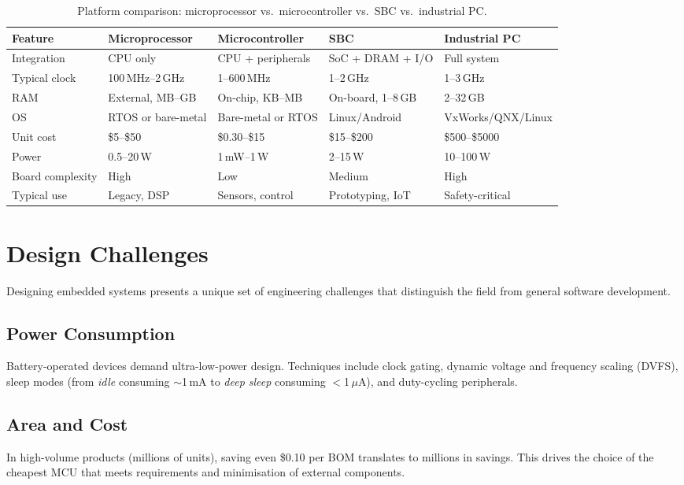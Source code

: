\begin{table}[H]
\centering
\caption{Platform comparison: microprocessor vs.\ microcontroller vs.\ SBC vs.\ industrial PC.}
\label{tab:intro:platforms}
\begin{tabularx}{\textwidth}{l X X X X}
\toprule
\textbf{Feature} & \textbf{Microprocessor} & \textbf{Microcontroller} & \textbf{SBC} & \textbf{Industrial PC} \\
\midrule
Integration & CPU only & CPU + peripherals & SoC + DRAM + I/O & Full system \\
Typical clock & 100\,MHz--2\,GHz & 1--600\,MHz & 1--2\,GHz & 1--3\,GHz \\
RAM & External, MB--GB & On-chip, KB--MB & On-board, 1--8\,GB & 2--32\,GB \\
OS & RTOS or bare-metal & Bare-metal or RTOS & Linux/Android & VxWorks/QNX/Linux \\
Unit cost & \$5--\$50 & \$0.30--\$15 & \$15--\$200 & \$500--\$5000 \\
Power & 0.5--20\,W & 1\,mW--1\,W & 2--15\,W & 10--100\,W \\
Board complexity & High & Low & Medium & High \\
Typical use & Legacy, DSP & Sensors, control & Prototyping, IoT & Safety-critical \\
\bottomrule
\end{tabularx}
\end{table}

\section{Design Challenges}
\label{sec:intro:challenges}

Designing embedded systems presents a unique set of engineering challenges that distinguish the field from general software development.

\subsection{Power Consumption}
Battery-operated devices demand ultra-low-power design. Techniques include clock gating, dynamic voltage and frequency scaling (DVFS), sleep modes (from \emph{idle} consuming $\sim$1\,mA to \emph{deep sleep} consuming $<$1\,$\mu$A), and duty-cycling peripherals.

\subsection{Area and Cost}
In high-volume products (millions of units), saving even \$0.10 per BOM translates to millions in savings. This drives the choice of the cheapest MCU that meets requirements and minimisation of external components.

